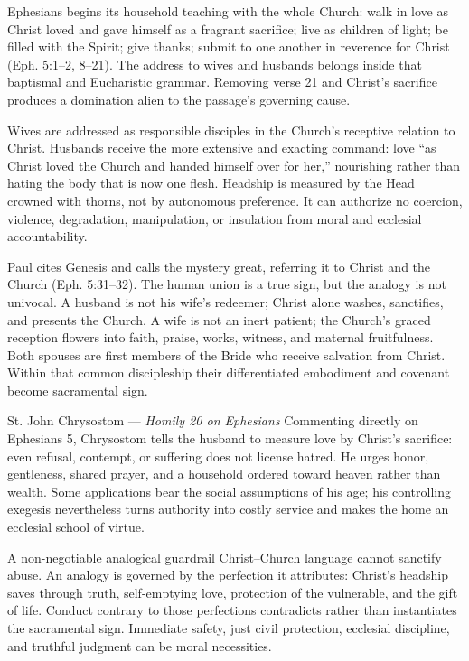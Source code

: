 Ephesians begins its household teaching with the whole Church: walk in love as Christ loved and gave himself as a fragrant sacrifice; live as children of light; be filled with the Spirit; give thanks; submit to one another in reverence for Christ (Eph. 5:1--2, 8--21). The address to wives and husbands belongs inside that baptismal and Eucharistic grammar. Removing verse 21 and Christ's sacrifice produces a domination alien to the passage's governing cause.

Wives are addressed as responsible disciples in the Church's receptive relation to Christ. Husbands receive the more extensive and exacting command: love ``as Christ loved the Church and handed himself over for her,'' nourishing rather than hating the body that is now one flesh. Headship is measured by the Head crowned with thorns, not by autonomous preference. It can authorize no coercion, violence, degradation, manipulation, or insulation from moral and ecclesial accountability.

Paul cites Genesis and calls the mystery great, referring it to Christ and the Church (Eph. 5:31--32). The human union is a true sign, but the analogy is not univocal. A husband is not his wife's redeemer; Christ alone washes, sanctifies, and presents the Church. A wife is not an inert patient; the Church's graced reception flowers into faith, praise, works, witness, and maternal fruitfulness. Both spouses are first members of the Bride who receive salvation from Christ. Within that common discipleship their differentiated embodiment and covenant become sacramental sign.

\begin{sourcecard}{St. John Chrysostom --- \emph{Homily 20 on Ephesians}}
Commenting directly on Ephesians 5, Chrysostom tells the husband to measure love by Christ's sacrifice: even refusal, contempt, or suffering does not license hatred. He urges honor, gentleness, shared prayer, and a household ordered toward heaven rather than wealth. Some applications bear the social assumptions of his age; his controlling exegesis nevertheless turns authority into costly service and makes the home an ecclesial school of virtue.
\end{sourcecard}

\begin{studybox}{A non-negotiable analogical guardrail}
Christ--Church language cannot sanctify abuse. An analogy is governed by the perfection it attributes: Christ's headship saves through truth, self-emptying love, protection of the vulnerable, and the gift of life. Conduct contrary to those perfections contradicts rather than instantiates the sacramental sign. Immediate safety, just civil protection, ecclesial discipline, and truthful judgment can be moral necessities.
\end{studybox}

